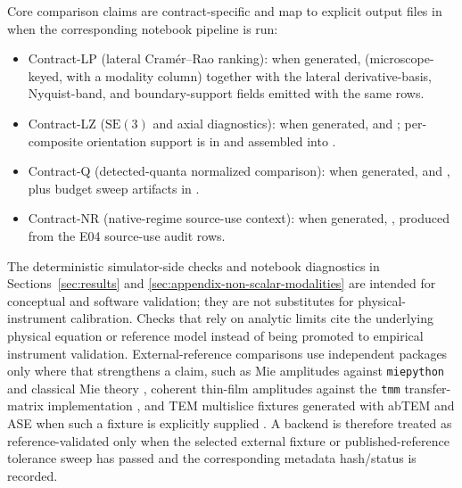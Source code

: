 Core comparison claims are contract-specific and map to explicit output files in  when the corresponding notebook pipeline is run:
\begin{itemize}
\item Contract-LP (lateral Cram\'{e}r--Rao ranking): when generated,  (microscope-keyed, with a modality column) together with the lateral derivative-basis, Nyquist-band, and boundary-support fields emitted with the same rows.
\item Contract-LZ (\(\mathrm{SE}(3)\) and axial diagnostics): when generated,  and ; per-composite orientation support is in  and assembled into .
\item Contract-Q (detected-quanta normalized comparison): when generated,  and , plus budget sweep artifacts in .
\item Contract-NR (native-regime source-use context): when generated, , produced from the E04 source-use audit rows.
\end{itemize}
The deterministic simulator-side checks and notebook diagnostics in Sections~\ref{sec:results} and \ref{sec:appendix-non-scalar-modalities} are intended for conceptual and software validation; they are not substitutes for physical-instrument calibration. Checks that rely on analytic limits cite the underlying physical equation or reference model instead of being promoted to empirical instrument validation. External-reference comparisons use independent packages only where that strengthens a claim, such as Mie amplitudes against \texttt{miepython} and classical Mie theory \cite{mie-scattering,miepython-software}, coherent thin-film amplitudes against the \texttt{tmm} transfer-matrix implementation \cite{tmm-byrnes}, and TEM multislice fixtures generated with abTEM and ASE when such a fixture is explicitly supplied \cite{abtem-code,ase}. A backend is therefore treated as reference-validated only when the selected external fixture or published-reference tolerance sweep has passed and the corresponding metadata hash/status is recorded.

